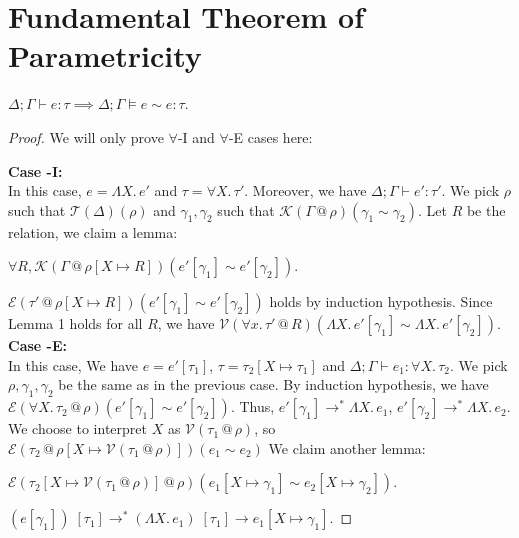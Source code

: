 \documentclass{lecturenotes}
\makeatletter
\newcommand{\fatype}[2]{\ensuremath{\forall #1.\,#2}}
\newcommand{\Abs}[2]{\Lambda #1.\,#2}
\newcommand{\App}[2]{#1\;[#2]}
\newcommand{\at}{\ensuremath{\mathrel{@}}}
\newcommand{\binval}[4]{\ensuremath{\mathcal{V}(#1 \at #2)(#3 \sim #4)}}
\newcommand{\binexpr}[4]{\ensuremath{\mathcal{E}(#1 \at #2)(#3 \sim #4)}}
\newcommand{\bintypectxt}[2]{\ensuremath{\mathcal{T}(#1)(#2)}}
\newcommand{\binctxt}[4]{\ensuremath{\mathcal{K}(#1 \at #2)(#3 \sim #4)}}
\makeatother
\begin{document}
\section{Fundamental Theorem of Parametricity}\label{thm:fundamental-theorem-of-parametricity}
\begin{thm}
    $\Delta; \Gamma \vdash e : \tau \implies \Delta; \Gamma \vDash  e \sim e : \tau$.
\end{thm}
\begin{proof}
    We will only prove $\forall$-I and $\forall$-E cases here:

    \noindent\textbf{Case \forall-I:}\\
    In this case, $e = \Abs{X}{e'}$ and $\tau = \fatype{X}{\tau'}$.
    Moreover, we have $\Delta; \Gamma \vdash e' : \tau'$. We pick $\rho$ such that $\bintypectxt{\Delta}{\rho}$
    and $\gamma_1, \gamma_2$ such that $\binctxt{\Gamma}{\rho}{\gamma_1}{\gamma_2}$. Let $R$ be the relation, we claim a lemma:
    \begin{lem}
        $\forall R, \binctxt{\Gamma}{\rho[X \mapsto R]}{e'[\gamma_1]}{e'[\gamma_2]}$.
    \end{lem}
    \noindent$\binexpr{\tau'}{\rho[X \mapsto R]}{e'[\gamma_1]}{e'[\gamma_2]}$ holds by induction hypothesis.
    Since Lemma 1 holds for all $R$, we have $\binval{\fatype{x}{\tau'}}{R}{\Abs{X}{e'[\gamma_1]}}{\Abs{X}{e'[\gamma_2]}}$.\\

    \noindent\textbf{Case \forall-E:}\\
    In this case, We have $e = e'[\tau_1]$, $\tau = \tau_2[X \mapsto \tau_1]$ and $\Delta; \Gamma \vdash e_1 : \fatype{X}{\tau_2}$.
    We pick $\rho, \gamma_1, \gamma_2$ be the same as in the previous case. By induction hypothesis, we have
    $\binexpr{\fatype{X}{\tau_2}}{\rho}{e'[\gamma_1]}{e'[\gamma_2]}$. Thus, $e'[\gamma_1] \to^\ast \Abs{X}{e_1}$, $e'[\gamma_2] \to^\ast \Abs{X}{e_2}$.
    We choose to interpret $X$ as $\mathcal{V}(\tau_1 \at \rho)$, so $\binexpr{\tau_2}{\rho[X \mapsto \mathcal{V}(\tau_1 \at \rho)]}{e_1}{e_2}$
    We claim another lemma:
    \begin{lem}
        $\binexpr{\tau_2[X \mapsto \mathcal{V}(\tau_1 \at \rho)]}{\rho}{e_1[X \mapsto \gamma_1]}{e_2[X \mapsto \gamma_2]}$.
    \end{lem}
    \noindent$\App{(e[\gamma_1])}{\tau_1} \to^\ast \App{(\Abs{X}{e_1})}{\tau_1} \to e_1[X \mapsto \gamma_1]$.
\end{proof}
\end{document}
